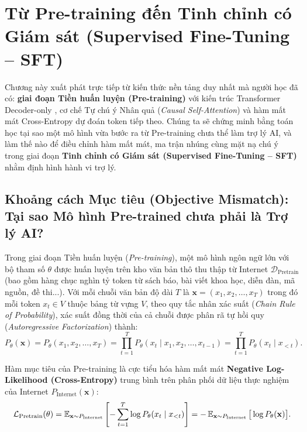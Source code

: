 ﻿\chapter{Từ Pre-training đến Tinh chỉnh có Giám sát (Supervised Fine-Tuning -- SFT)}
\label{chap:sft}

\begin{pedagogy}
Chương này xuất phát trực tiếp từ kiến thức nền tảng duy nhất mà người học đã có: \textbf{giai đoạn Tiền huấn luyện (Pre-training)} với kiến trúc Transformer Decoder-only \citep{vaswani2017attention}, cơ chế Tự chú ý Nhân quả (\textit{Causal Self-Attention}) và hàm mất mát Cross-Entropy dự đoán token tiếp theo. Chúng ta sẽ chứng minh bằng toán học tại sao một mô hình vừa bước ra từ Pre-training chưa thể làm trợ lý AI, và làm thế nào để điều chỉnh hàm mất mát, ma trận nhúng cùng mặt nạ chú ý trong giai đoạn \textbf{Tinh chỉnh có Giám sát (Supervised Fine-Tuning -- SFT)} nhằm định hình hành vi trợ lý.
\end{pedagogy}

\section{Khoảng cách Mục tiêu (Objective Mismatch): Tại sao Mô hình Pre-trained chưa phải là Trợ lý AI?}
\label{sec:objective_mismatch}

Trong giai đoạn Tiền huấn luyện (\textit{Pre-training}), một mô hình ngôn ngữ lớn với bộ tham số $\theta$ được huấn luyện trên kho văn bản thô thu thập từ Internet $\mathcal{D}_{\text{Pretrain}}$ (bao gồm hàng chục nghìn tỷ token từ sách báo, bài viết khoa học, diễn đàn, mã nguồn, đề thi...). Với mỗi chuỗi văn bản độ dài $T$ là $\mathbf{x} = (x_1, x_2, \dots, x_T)$ trong đó mỗi token $x_t \in V$ thuộc bảng từ vựng $V$, theo quy tắc nhân xác suất (\textit{Chain Rule of Probability}), xác suất đồng thời của cả chuỗi được phân rã tự hồi quy (\textit{Autoregressive Factorization}) thành:
\begin{equation}
    P_\theta(\mathbf{x}) = P_\theta(x_1, x_2, \dots, x_T) = \prod_{t=1}^{T} P_\theta(x_t \mid x_1, x_2, \dots, x_{t-1}) = \prod_{t=1}^{T} P_\theta(x_t \mid x_{<t}).
    \label{eq:ar_factorization}
\end{equation}

Hàm mục tiêu của Pre-training là cực tiểu hóa hàm mất mát \textbf{Negative Log-Likelihood (Cross-Entropy)} trung bình trên phân phối dữ liệu thực nghiệm của Internet $P_{\text{Internet}}(\mathbf{x})$:
\begin{equation}
    \mathcal{L}_{\text{Pretrain}}(\theta) = \operatorname{\mathbb{E}}_{\mathbf{x} \sim P_{\text{Internet}}} \left[ -\sum_{t=1}^{T} \log P_\theta(x_t \mid x_{<t}) \right] = -\operatorname{\mathbb{E}}_{\mathbf{x} \sim P_{\text{Internet}}} \big[ \log P_\theta(\mathbf{x}) \big].
    \label{eq:pretrain_loss}
\end{equation}

